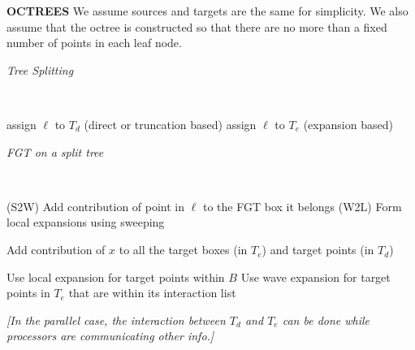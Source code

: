 \documentclass[conference]{IEEEtran}
\begin{document}
%

{\bf OCTREES}
We assume sources and targets are the same for simplicity. We also assume that the octree is constructed so that there are no more than a fixed number of points in each leaf node. 

\begin{algorithm}[!h]
\caption{{\em Tree Splitting}}
{\tt
\begin{algorithmic}
\STATE
      \IF {$|\ell| > \sqrt{\delta}$}
          \STATE assign $\ell$ to $T_d$ (direct or truncation based)
      \ELSE
          \STATE assign $\ell$ to $T_e$ (expansion based)
      \ENDIF
  \ENDFOR
\STATE
\end{algorithmic}
}
\end{algorithm}


\begin{algorithm}[!h]
\caption{\em FGT on a split tree}
{\tt
\begin{algorithmic}
\STATE
      \STATE (S2W) Add contribution of point in $\ell$ to the FGT box it belongs
  \ENDFOR
  \STATE
  \STATE (W2L) Form local expansions using sweeping
  \STATE 

          \STATE Add contribution of $x$ to all the target boxes (in $T_e$) and target points (in $T_d$)     
       \ENDFOR  
  \ENDFOR
  
  \STATE 
        \STATE Use local expansion for target points within $B$ 
        \STATE
        \STATE Use wave expansion for target points in $T_e$ that are within its interaction list
     \ENDFOR  
\STATE
\end{algorithmic}
}
\end{algorithm}

{\em [In the parallel case, the interaction between $T_d$ and $T_e$ can be done while processors are communicating other info.] }
\end{document}
